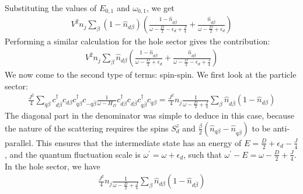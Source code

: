 \documentclass[reprint,superscriptaddress,floatfix]{revtex4-2}
\begin{document}
\begin{widetext}
Substituting the values of \(E_{0,1}\) and \(\omega_{0,1}\), we get
\begin{equation}\begin{aligned}
	\label{ren_ed_Vp}
	V^2 n_j\sum_{\beta}\left( 1 - \hat n_{d\beta} \right)\left( \frac{1-\hat n_{d \overline\beta }}{\omega - \frac{D}{2} - \epsilon_d + \frac{J}{4}} + \frac{\hat n_{d \overline\beta}}{\omega - \frac{D}{2} + \epsilon_d}\right)
\end{aligned}\end{equation}
Performing a similar calculation for the hole sector gives the contribution:
\begin{equation}\begin{aligned}
	\label{ren_ed_Vh}
	V^2 n_j\sum_{\beta}\hat n_{d\beta}\left( \frac{1-\hat n_{d \overline\beta }}{\omega - \frac{D}{2} + \epsilon_d} + \frac{\hat n_{d \overline\beta}}{\omega - \frac{D}{2} - \epsilon_d + \frac{J}{4}}\right)
\end{aligned}\end{equation}
We now come to the second type of terms: spin-spin. We first look at the particle sector:
\begin{equation}\begin{aligned}
	\label{ren_ed_Jpp}
	\frac{J^2}{4}\sum_{q\beta}c^\dagger_{d\overline\beta}c_{d\beta}c^\dagger_{q\beta}c_{-q\overline\beta} \frac{1}{\omega - H_D}c^\dagger_{d\beta}c_{d\overline\beta}c^\dagger_{q\overline\beta}c_{q\beta} = \frac{J^2}{4} n_j\frac{1}{\omega - \frac{D}{2} + \frac{J}{4}} \sum_{\beta}\hat n_{d\overline\beta}\left( 1 - \hat n_{d\beta} \right)
\end{aligned}\end{equation}
The diagonal part in the denominator was simple to deduce in this case, because the nature of the scattering requires the spins \(S_d^z\) and \(\frac{\beta}{2}\left(\hat n_{q\beta} - \hat n_{q \overline\beta}\right)\) to be anti-parallel. This ensures that the intermediate state has an energy of \(E = \frac{D}{2} + \epsilon_d - \frac{J}{4}\), and the quantum fluctuation scale is \(\omega^\prime = \omega + \epsilon_d\), such that \(\omega^\prime - E = \omega - \frac{D}{2} + \frac{J}{4}\). In the hole sector, we have
\begin{equation}\begin{aligned}
	\label{ren_ed_Jph}
	\frac{J^2}{4} n_j\frac{1}{\omega - \frac{D}{2} + \frac{J}{4}} \sum_{\beta}\hat n_{d\beta}\left( 1 - \hat n_{d\overline\beta} \right)
\end{aligned}\end{equation}


\end{widetext}
\end{document}
